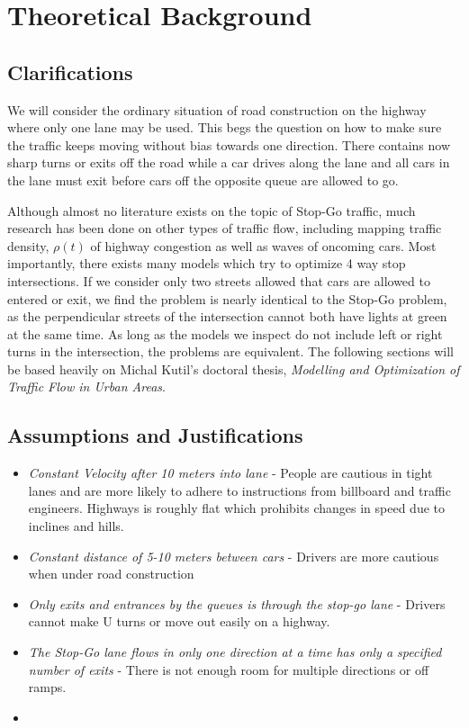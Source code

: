 \documentclass[a4paper]{article}
\begin{document}
\section{Theoretical Background}

\subsection{Clarifications}

We will consider the ordinary situation of road construction on the highway where only one lane may be used. This  begs the question on how to make sure the traffic keeps moving without bias towards one direction. There contains now sharp turns or exits off the road while a car drives along the lane and all cars in the lane must exit before cars off the opposite queue are allowed to go.

Although almost no literature exists on the topic of Stop-Go traffic, much research has been done on other types of traffic flow, including mapping traffic density, $\rho(t)$ of highway congestion as well as waves of oncoming cars. Most importantly, there exists many models which try to optimize 4 way stop intersections. If we consider only two streets allowed that cars are allowed to entered or exit, we find the problem is nearly identical to the Stop-Go problem, as the perpendicular streets of the intersection cannot both have lights at green at the same time. As long as the models we inspect do not include left or right turns in the intersection, the problems are equivalent. The following sections will be based heavily on Michal Kutil's doctoral thesis, \textit{Modelling and Optimization
of Traffic Flow in Urban Areas}.
\subsection{Assumptions and Justifications}

\begin{itemize}
\item \textit{Constant Velocity after 10 meters into lane} - People are cautious in tight lanes and are more likely to adhere to instructions from billboard and traffic engineers. Highways is roughly flat which prohibits changes in speed due to inclines and hills.
\item \textit{Constant distance of 5-10 meters between cars} - Drivers are more cautious when under road construction
\item \textit{Only exits and entrances by the queues is through the stop-go lane} - Drivers cannot make U turns or move out easily on a highway.
\item \textit{The Stop-Go lane flows in only one direction at a time has only a specified number of exits} - There is not enough room for multiple directions or off ramps.
\item 
\end{itemize}
\end{document}
